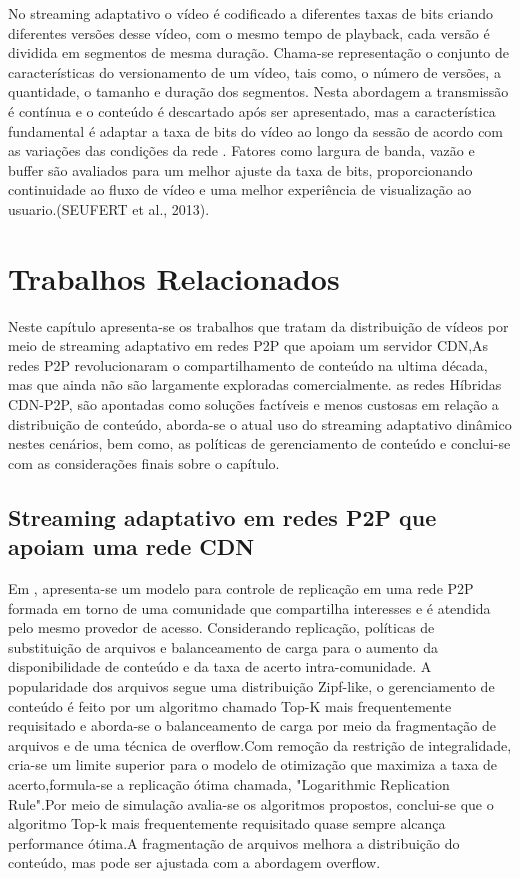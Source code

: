 \documentclass[
	12pt,
	oneside,
	a4paper,
	english,
	brazil
	]{abntex2ppgsi}
\begin{document}
No streaming adaptativo o vídeo é codificado a diferentes taxas de bits  criando diferentes versões desse vídeo, com o mesmo tempo de playback, cada versão é dividida em segmentos de mesma duração. Chama-se representação o conjunto de características do versionamento de um vídeo, tais como, o número de versões, a quantidade, o tamanho e duração dos segmentos. Nesta abordagem a transmissão é contínua e o conteúdo é descartado após ser apresentado, mas a característica fundamental é adaptar a taxa de bits do vídeo ao longo da sessão de acordo com as variações das condições da rede . Fatores como largura de banda, vazão e buffer são avaliados para um melhor ajuste da taxa de bits, proporcionando continuidade ao fluxo de vídeo e uma melhor experiência de visualização ao usuario.(SEUFERT et al., 2013).



\chapter{Trabalhos Relacionados}

Neste capítulo apresenta-se os trabalhos que tratam da distribuição de vídeos por meio de streaming adaptativo em redes P2P que apoiam um servidor CDN,As redes P2P revolucionaram o compartilhamento de conteúdo na ultima década, mas que ainda não são largamente exploradas comercialmente. as redes Híbridas CDN-P2P, são apontadas como soluções factíveis e menos custosas em relação a distribuição de conteúdo, aborda-se o atual uso do streaming adaptativo dinâmico nestes cenários, bem como, as políticas de gerenciamento de conteúdo e conclui-se com as considerações finais sobre o capítulo.

\section{Streaming adaptativo em redes P2P que apoiam uma rede CDN}

Em \cite{Kangasharju2007}, apresenta-se um modelo para controle de replicação em uma rede P2P formada em torno de uma comunidade que compartilha interesses e é atendida pelo mesmo provedor de acesso. Considerando replicação, políticas de substituição de arquivos e balanceamento de carga para o aumento da disponibilidade de conteúdo e da taxa de acerto intra-comunidade. A popularidade dos arquivos segue uma distribuição Zipf-like, o gerenciamento de conteúdo é feito por um algoritmo chamado Top-K mais frequentemente requisitado e aborda-se o balanceamento de carga por meio da fragmentação de arquivos e de uma técnica de overflow.Com remoção da restrição de integralidade, cria-se um limite superior para o modelo de otimização que maximiza a taxa de acerto,formula-se a replicação ótima chamada, "Logarithmic Replication Rule".Por meio de simulação avalia-se os algoritmos propostos, conclui-se que o algoritmo Top-k mais frequentemente requisitado quase sempre alcança performance ótima.A fragmentação de arquivos melhora a distribuição do conteúdo, mas pode ser ajustada com a abordagem overflow.
\end{document}
